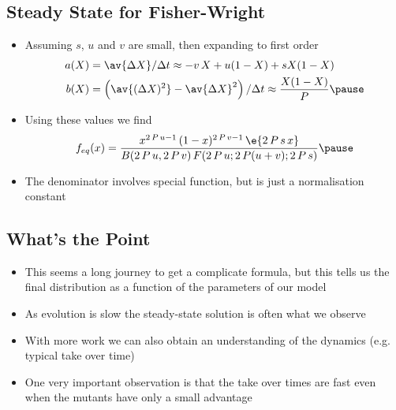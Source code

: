 
\begin{slide}
\section{Steady State for Fisher-Wright}

\begin{PauseHighLight}
  \begin{itemize}
  \item Assuming $s$, $u$ and $v$ are small, then expanding to first
    order
    \begin{align*}
      a(X) &= \av{\Delta X}/\Delta t \approx -v \,X + u (1-X) + s X (1-X)\\
      b(X) &= \left(\av{(\Delta X)^2}-\av{\Delta X}^2\right)/\Delta t
             \approx \frac{X(1-X)}{P}\pause
    \end{align*}
  \item Using these values we find
    \begin{align*}
      f_{eq}(x) = \frac{x^{2\,P\,u-1} \, (1-x)^{2\,P\,v-1} \,
        \e{2\,P\,s\,x}}{B(2\,P\,u, 2\,P\,v) \, F(2\,P\,u;2\,P(u+v);2\,P\,s)}
      \pause
    \end{align*}
  \item The denominator involves special function, but is just a
    normalisation constant\pause
  \end{itemize}
\end{PauseHighLight}

\end{slide}


\begin{slide}
\section{What's the Point}

\begin{PauseHighLight}
  \begin{itemize}
  \item This seems a long journey to get a complicate formula, but this
    tells us the final distribution as a function of the parameters of
    our model\pause
  \item As evolution is slow the steady-state solution is often what we
    observe\pause
  \item With more work we can also obtain an understanding of the
    dynamics (e.g. typical take over time)\pause
  \item One very important observation is that the take over times are
    fast even when the mutants have only a small advantage\pause
  \end{itemize}
\end{PauseHighLight}

\end{slide}



